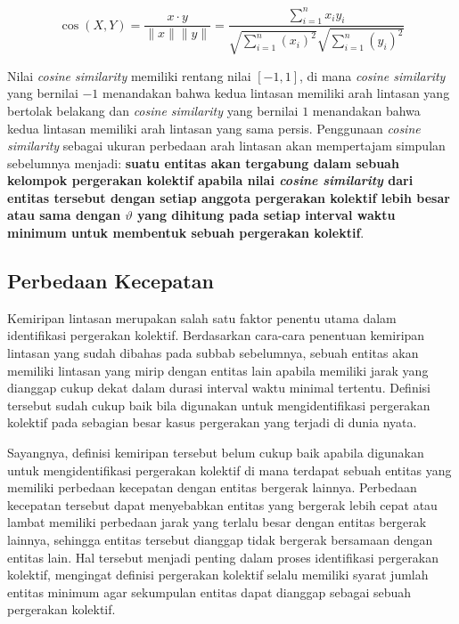 \documentclass[a4paper,twoside]{article}
\begin{document}
\begin{equation}
    \cos (X, Y)= \frac{x \cdot y}{\|x\| \|y\|} = \frac{ \sum_{i=1}^{n}{x_i y_i}}{ \sqrt{\sum_{i=1}^{n}{(x_i)^2}} \sqrt{\sum_{i=1}^{n}{( y_i)^2}} }
    \label{bab3:cosine-similarity}
\end{equation}

Nilai \textit{cosine similarity} memiliki rentang nilai $[-1, 1]$, di mana \textit{cosine similarity} yang bernilai $-1$ menandakan bahwa kedua lintasan memiliki arah lintasan yang bertolak belakang dan \textit{cosine similarity} yang bernilai $1$ menandakan bahwa kedua lintasan memiliki arah lintasan yang sama persis. Penggunaan \textit{cosine similarity} sebagai ukuran perbedaan arah lintasan akan mempertajam simpulan sebelumnya menjadi: \textbf{suatu entitas akan tergabung dalam sebuah kelompok pergerakan kolektif apabila nilai \textit{cosine similarity} dari entitas tersebut dengan setiap anggota pergerakan kolektif lebih besar atau sama dengan $\vartheta$ yang dihitung pada setiap interval waktu minimum untuk membentuk sebuah pergerakan kolektif}.

\subsection{Perbedaan Kecepatan}

Kemiripan lintasan merupakan salah satu faktor penentu utama dalam identifikasi pergerakan kolektif. Berdasarkan cara-cara penentuan kemiripan lintasan yang sudah dibahas pada subbab sebelumnya, sebuah entitas akan memiliki lintasan yang mirip dengan entitas lain apabila memiliki jarak yang dianggap cukup dekat dalam durasi interval waktu minimal tertentu. Definisi tersebut sudah cukup baik bila digunakan untuk mengidentifikasi pergerakan kolektif pada sebagian besar kasus pergerakan yang terjadi di dunia nyata.

Sayangnya, definisi kemiripan tersebut belum cukup baik apabila digunakan untuk mengidentifikasi pergerakan kolektif di mana terdapat sebuah entitas yang memiliki perbedaan kecepatan dengan entitas bergerak lainnya. Perbedaan kecepatan tersebut dapat menyebabkan entitas yang bergerak lebih cepat atau lambat memiliki perbedaan jarak yang terlalu besar dengan entitas bergerak lainnya, sehingga entitas tersebut dianggap tidak bergerak bersamaan dengan entitas lain. Hal tersebut menjadi penting dalam proses identifikasi pergerakan kolektif, mengingat definisi pergerakan kolektif selalu memiliki syarat jumlah entitas minimum agar sekumpulan entitas dapat dianggap sebagai sebuah pergerakan kolektif.
    
\end{document}

